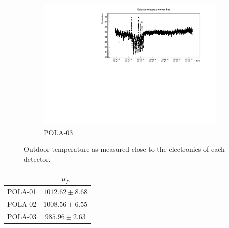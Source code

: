 \documentclass[12pt,a4paper]{amsart}
\begin{document}
\begin{figure}
\begin{subfigure}[b]{0.6\textwidth}
		\includegraphics[width=\textwidth]{../data/plots/POLA-03/OutdoorTemp_POLA-03.pdf}
		\caption{POLA-03}
		\label{fig:outdoortemp_POLA-03}
	\end{subfigure}
	\caption{Outdoor temperature as measured close to the electronics of each detector.}
	\label{fig:outdoortemp}
\end{figure}

\begin{table}[t]
\begin{tabular}{c|c}
\hline\hline
        & $\mu_P$           \\ \hline
POLA-01 & $1012.62\pm 8.68$ \\
POLA-02 & $1008.56\pm 6.55$ \\
POLA-03 & $985.96\pm2.63$   \\
\hline \hline
\end{tabular}
\end{table}
\end{document}
